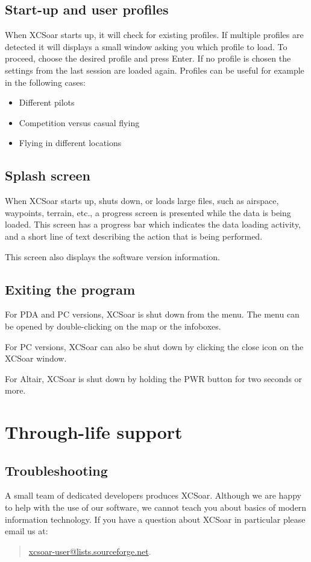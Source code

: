 \documentclass[a4paper,12pt]{refrep}
\begin{document}
\subsection*{Start-up and user profiles}
When XCSoar starts up, it will check for existing profiles. If multiple
profiles are detected it will displays a small window asking you which profile
to load. To proceed, choose the desired profile and press Enter. If no
profile is chosen the settings from the last session are loaded again. Profiles
can be useful for example in the following cases:
\begin{itemize}
\item Different pilots
\item Competition versus casual flying
\item Flying in different locations
\end{itemize}


\subsection*{Splash screen}
When XCSoar starts up, shuts down, or loads large files, such as airspace,
waypoints, terrain, etc., a progress screen is presented while the data is being
loaded. This screen has a progress bar which indicates the data loading
activity, and a short line of text describing the action that is being performed.

This screen also displays the software version information.

\subsection*{Exiting the program}
For PDA and PC versions, XCSoar is shut down from the menu. The menu can be
opened by double-clicking on the map or the infoboxes.
\begin{quote}
\end{quote}

For PC versions, XCSoar can also be shut down by clicking the close icon
on the XCSoar window.

For Altair, XCSoar is shut down by holding the PWR button for two seconds or
more.

\section{Through-life support}

\subsection*{Troubleshooting}
A small team of dedicated developers produces XCSoar. Although we are
happy to help with the use of our software, we cannot teach you about
basics of modern information technology. If you have a question about XCSoar in
particular please email us at: 
\begin{quote}
\url{xcsoar-user@lists.sourceforge.net}.
\end{quote}
\end{document}

